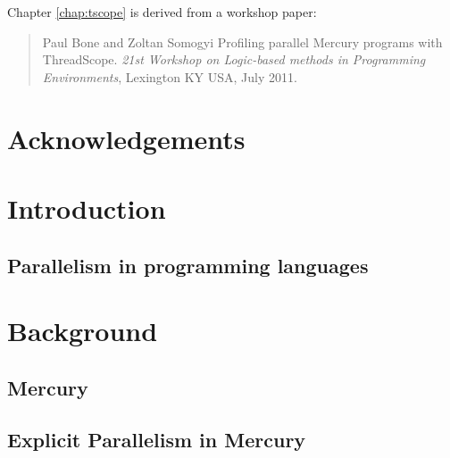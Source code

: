 \documentclass[a4paper,twoside]{report}
\begin{document}

Chapter \ref{chap:tscope} is derived from a workshop paper:

\begin{quote}
Paul Bone and Zoltan Somogyi
Profiling parallel Mercury programs with ThreadScope.
{\em 21st Workshop on Logic-based methods in Programming Environments},
Lexington KY USA, July 2011.
\end{quote}


\chapter*{Acknowledgements}

\tableofcontents

\listoffigures

\listoftables

\chapter{Introduction}
\label{chap:intro}


\section{Parallelism in programming languages}
\label{sec:literature_review}


\chapter{Background}

\section{Mercury}
\label{sec:back_mercury}


\section{Explicit Parallelism in Mercury}
\label{sec:back_mer_par}

\end{document}

